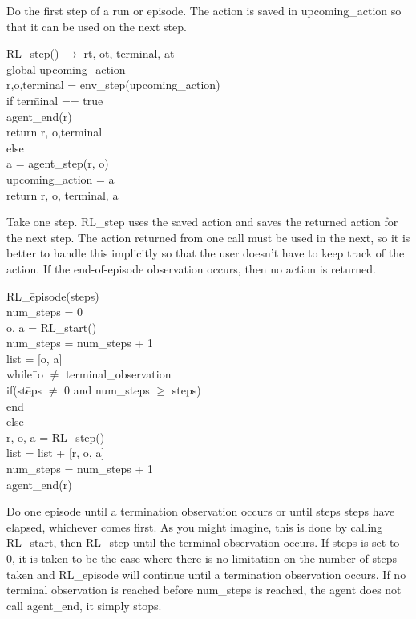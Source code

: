 \documentclass[11pt]{article}
\begin{document}
Do the first step of a run or episode.  The action is saved in upcoming\_action so that it can be used on the next step.
\begin{tabbing}
RL\_\=step() $\rightarrow$ rt, ot, terminal, at\\
\>global upcoming\_action\\
\>r,o,terminal = env\_step(upcoming\_action)\\
\>if ter\=minal == true\\
\>\>    agent\_end(r)\\
\>\>    return r, o,terminal\\
\>else\=\\
\>\>    a = agent\_step(r, o)\\
\>\>    upcoming\_action = a\\
\>return r, o, terminal, a
\end{tabbing}
Take one step.  RL\_step uses the saved action and saves the returned action for the next step.  The action returned from one call must be used in the next, so it is better to handle this implicitly so that the user doesn't have to keep track of the action.  If the end-of-episode observation occurs, then no action is returned.
\begin{tabbing}     
RL\_\=episode(steps)\\
\>num\_steps = 0\\
\>o, a = RL\_start()\\
\>num\_steps = num\_steps + 1\\
\>list = [o, a]\\
\>while\=  \ o $\neq$ terminal\_observation\\
\>\>    if(st\=eps $\neq$ 0 and num\_steps $\geq$ steps)\\
\>\>\>    end\\
\>\>    els\=e\\
\>\>\>    r, o, a = RL\_step()\\
\>\>\>    list = list + [r, o, a]\\
\>\>\>    num\_steps = num\_steps + 1\\
\>                agent\_end(r)\\
\end{tabbing}
Do one episode until a termination observation occurs or until steps steps have elapsed, whichever comes first.  As you might imagine, this is done by calling RL\_start, then RL\_step until the terminal observation occurs.  If steps is set to 0, it is taken to be the case where there is no limitation on the number of steps taken and RL\_episode will continue until a termination observation occurs. If no terminal observation is reached before num\_steps is reached, the agent does not call agent\_end, it simply stops.
\end{document}
